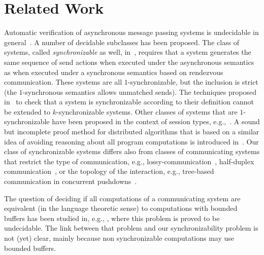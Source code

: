 \section{Related Work}\label{sec:related}

Automatic verification of asynchronous message passing systems is undecidable in general~\cite{DBLP:journals/jacm/BrandZ83}. 
A number of decidable subclasses has been proposed. 
The class of systems, called \emph{synchronizable} as well, in~\cite{DBLP:journals/tcs/BasuB16}, requires that a system generates the same sequence of send actions when executed under the asynchronous semantics as when executed under a synchronous semantics based on rendezvous communication. These systems are all $1$-synchronizable, but the inclusion is strict (the $1$-synchronous semantics allows unmatched sends). The techniques proposed in~\cite{DBLP:journals/tcs/BasuB16} to check that a system is synchronizable according to their definition cannot be extended to $k$-synchronizable systems.
Other classes of systems that are $1$-synchronizable have been proposed in the context of session types, e.g.,~\cite{DBLP:conf/esop/DenielouY12,DBLP:journals/jacm/HondaYC16,DBLP:conf/esop/HondaVK98,DBLP:conf/popl/LangeTY15}. A sound but incomplete proof method for distributed algorithms that is based on a similar idea of avoiding reasoning about all program computations is introduced in~\cite{DBLP:journals/pacmpl/BakstGKJ17}.
Our class of synchronizable systems differs also from classes of communicating systems that restrict the type of communication, e.g., lossy-communication~\cite{DBLP:journals/iandc/AbdullaJ96}, half-duplex communication~\cite{DBLP:journals/iandc/CeceF05}, or the topology of the interaction, e.g., tree-based communication in concurrent pushdowns~\cite{DBLP:conf/tacas/TorreMP08,DBLP:journals/corr/abs-1209-0359}.

The question of deciding if all computations of a communicating system are equivalent (in the language theoretic sense) to computations with bounded buffers has been studied in, e.g., \cite{DBLP:journals/fuin/GenestKM07}, where this problem is proved to be undecidable. The link between that problem and our synchronizability problem is not (yet) clear, mainly because non synchronizable computations may use bounded buffers.

